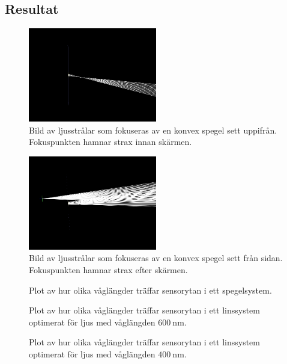 \documentclass[a4paper]{article}
\begin{document}
\subsection{Resultat}

\FloatBarrier

\begin{figure}[h]
	\centering
	\includegraphics[width=0.5\textwidth]{Data/FRED/FRED1.jpg}
	\caption{Bild av ljusstrålar som fokuseras av en konvex spegel sett uppifrån. Fokuspunkten hamnar strax innan skärmen.}
	\label{fig:astigmAbove}
\end{figure}
\begin{figure}[h]
	\centering
	\includegraphics[width=0.5\textwidth]{Data/FRED/FRED2.jpg}
	\caption{Bild av ljusstrålar som fokuseras av en konvex spegel sett från sidan. Fokuspunkten hamnar strax efter skärmen.}
	\label{fig:astigmSide}
\end{figure}
\begin{figure}[h]
	\centering
	
	\caption{Plot av hur olika våglängder träffar sensorytan i ett spegelsystem.}
	\label{fig:chrMir}
\end{figure}
\begin{figure}[h]
	\centering
	
	\caption{Plot av hur olika våglängder träffar sensorytan i ett linssystem optimerat för ljus med våglängden $\SI{600}{\nano\meter}$.}
	\label{fig:chrLens1}
\end{figure}
\begin{figure}[h]
	\centering
	
	\caption{Plot av hur olika våglängder träffar sensorytan i ett linssystem optimerat för ljus med våglängden $\SI{400}{\nano\meter}$.}
	\label{fig:chrLens2}
\end{figure}
\end{document}
